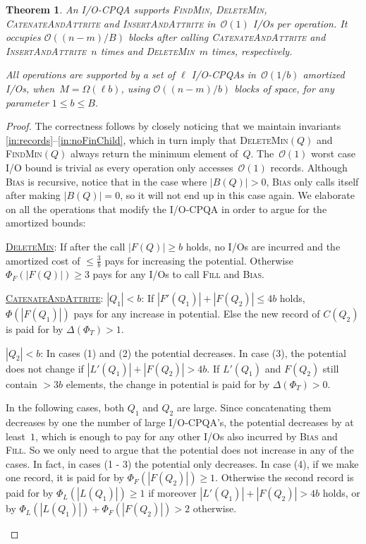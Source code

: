 \documentclass{sig-alternate}
\newtheorem{theorem}{Theorem}
\newcommand{\bigO}{\mathcal{O}}
\newcommand{\iref}[1]{\ref{#1}} \newcommand{\attr}[1]{\widetilde{#1}}
\renewcommand{\(}{\left(}
\renewcommand{\)}{\right)}
\begin{document}
\begin{theorem} \label{thm:iocpqa}
  An I/O-CPQA supports \textsc{FindMin}, \textsc{DeleteMin},
  \textsc{CatenateAndAttrite} and \textsc{InsertAndAttrite} in~$\bigO(1)$ I/Os
  per operation. It occupies $\bigO((n-m)/B)$ blocks after calling
  \textsc{CatenateAndAttrite} and \textsc{InsertAndAttrite}~$n$ times and
  \textsc{DeleteMin}~$m$ times, respectively.

  All operations are supported by a set of $\ell$ I/O-CPQAs in~$\bigO(1/b)$
  amortized I/Os, when~$M =\Omega ( \ell b)$, using $\bigO((n-m)/b)$ blocks of
  space, for any parameter $1 \leq b \leq B$.
\end{theorem}
\begin{proof}
The correctness follows by closely noticing that we maintain invariants
\iref{in:records}--\iref{in:noFinChild}, which in turn imply that
\textsc{DeleteMin}$(Q)$ and \textsc{FindMin}$(Q)$ always return the minimum
element of~$Q$.
The~$\bigO(1)$ worst case I/O bound is trivial as every operation only
accesses~$\bigO(1)$ records. Although \textsc{Bias} is recursive, notice that in
the case where $|B(Q)| > 0$, \textsc{Bias} only calls itself after making
$|B(Q)| = 0$, so it will not end up in this case again.
We elaborate on all the operations that modify the I/O-CPQA in order to argue
for the amortized bounds:

\begin{confenv}
\noindent \underline{\textsc{DeleteMin}}: If after the call $|F(Q)| \geq b$
holds, no I/Os are incurred and the amortized cost of $\leq \frac{3}{b}$ pays
for increasing the potential. Otherwise $\Phi_F(|F(Q)|) \geq 3$ pays for any
I/Os to call \textsc{Fill} and \textsc{Bias}.

\noindent \underline{\textsc{CatenateAndAttrite}}: $|Q_1| < b$: If $|F'(Q_1)| +
|F(Q_2)| \leq 4b$ holds, $\Phi(|F(Q_1)|)$ pays for any increase in potential.
Else the new record of $C(Q_2)$ is paid for by  $\Delta ( \Phi_T )>1$.

$|Q_2| < b$: In cases (1) and (2) the potential decreases.  In case (3), the
potential does not change if $|L'(Q_1)| + |F(Q_2)| > 4b$. If $L'(Q_1)$ and
$F(Q_2)$ still contain $>3b$ elements, the change in potential is paid for by
$\Delta ( \Phi_T )>0$.

In the following cases, both $Q_1$ and $Q_2$ are large.  Since concatenating
them decreases by one  the number of large I/O-CPQA's, the potential decreases
by at least~$1$, which is enough to pay for any other I/Os also incurred by
\textsc{Bias} and \textsc{Fill}. So we only need to argue that the potential
does not increase in any of the cases.  In fact, in cases (1 - 3) the potential
only decreases.  In case (4), if we make one record, it is paid for by
$\Phi_F(|F(Q_2)|) \geq 1$. Otherwise the second record is paid for by
$\Phi_L(|L(Q_1)|) \geq 1$ if moreover $|L'(Q_1)| + |F(Q_2)| > 4b$ holds, or by
$\Phi_L(|L(Q_1)|) + \Phi_F(|F(Q_2)|) >2$ otherwise.


\end{confenv}
\end{proof}
\end{document}
